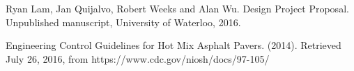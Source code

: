 \documentclass[11pt]{article}
\begin{document}
\newpage
\begin{thebibliography}{9}
Ryan Lam, Jan Quijalvo, Robert Weeks and Alan Wu. 
Design Project Proposal. 
Unpublished manuscript, University of Waterloo, 2016.

Engineering Control Guidelines for Hot Mix Asphalt Pavers. (2014). Retrieved July 26, 2016, from https://www.cdc.gov/niosh/docs/97-105/

\end{thebibliography}
\end{document}
